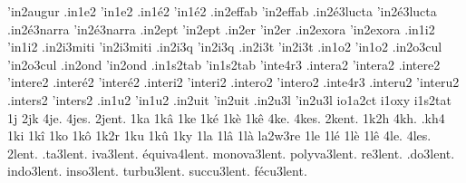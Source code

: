 {                    'in2augur
                    .in1e2
                    'in1e2
                    .in1é2
                    'in1é2
                    .in2effab %
                    'in2effab
                    .in2é3lucta
                    'in2é3lucta
                    .in2é3narra
                    'in2é3narra
                    .in2ept
                    'in2ept
                    .in2er
                    'in2er
                    .in2exora %
                    'in2exora
                    .in1i2
                    'in1i2
                    .in2i3miti
                    'in2i3miti
                    .in2i3q
                    'in2i3q
                    .in2i3t
                    'in2i3t
                    .in1o2
                    'in1o2
                    .in2o3cul
                    'in2o3cul
                    .in2ond
                    'in2ond
                    .in1s2tab
                    'in1s2tab
                    'inte4r3
                    .intera2
                    'intera2
                    .intere2
                    'intere2
                    .interé2
                    'interé2
                    .interi2
                    'interi2
                    .intero2
                    'intero2
                    .inte4r3
                    .interu2
                    'interu2
                    .inters2
                    'inters2
                    .in1u2
                    'in1u2
                    .in2uit
                    'in2uit
                    .in2u3l
                    'in2u3l
                    io1a2ct
                    i1oxy
                    i1s2tat
1j
2jk
4je.
4jes.
2jent. %
1ka
1kâ
1ke
1ké
1kè
1kê
4ke.
4kes.
2kent. %
1k2h
4kh.
.kh4
1ki
1kî
1ko
1kô
1k2r
1ku
1kû
1ky
1la
1lâ
1là
                    la2w3re
1le
1lé
1lè
1lê
4le.
4les.
      2lent.
   .ta3lent.
   iva3lent.
équiva4lent.
monova3lent.
polyva3lent.
    re3lent.
   .do3lent.
  indo3lent.
  inso3lent.
 turbu3lent.
 succu3lent.
  fécu3lent.
}
